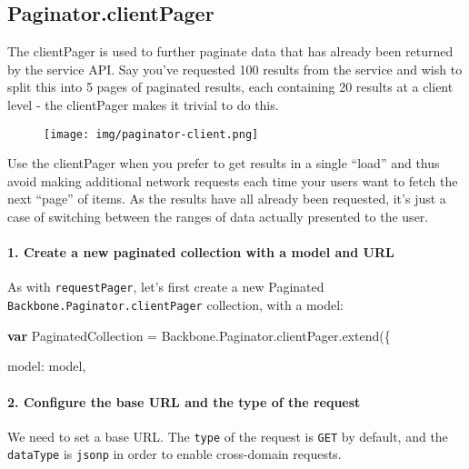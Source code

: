 \documentclass[9pt]{book}
\newenvironment{Shaded}{}{}
\newcommand{\KeywordTok}[1]{\textcolor[rgb]{0.00,0.44,0.13}{\textbf{{#1}}}}
\newcommand{\DataTypeTok}[1]{\textcolor[rgb]{0.56,0.13,0.00}{{#1}}}
\newcommand{\OtherTok}[1]{\textcolor[rgb]{0.00,0.44,0.13}{{#1}}}
\newcommand{\FunctionTok}[1]{\textcolor[rgb]{0.02,0.16,0.49}{{#1}}}
\newcommand{\NormalTok}[1]{{#1}}
\begin{document}
\subsection{Paginator.clientPager}\label{paginator.clientpager}

The clientPager is used to further paginate data that has already been
returned by the service API. Say you've requested 100 results from the
service and wish to split this into 5 pages of paginated results, each
containing 20 results at a client level - the clientPager makes it
trivial to do this.

\begin{figure}[htbp]
\centering
\texttt{[image: img/paginator-client.png]}
\end{figure}

Use the clientPager when you prefer to get results in a single ``load''
and thus avoid making additional network requests each time your users
want to fetch the next ``page'' of items. As the results have all
already been requested, it's just a case of switching between the ranges
of data actually presented to the user.

\paragraph{1. Create a new paginated collection with a model and
URL}\label{create-a-new-paginated-collection-with-a-model-and-url}

As with \texttt{requestPager}, let's first create a new Paginated
\texttt{Backbone.Paginator.clientPager} collection, with a model:

\begin{Shaded}
\begin{Highlighting}[]
    \KeywordTok{var} \NormalTok{PaginatedCollection = }\OtherTok{Backbone}\NormalTok{.}\OtherTok{Paginator}\NormalTok{.}\OtherTok{clientPager}\NormalTok{.}\FunctionTok{extend}\NormalTok{(\{}

        \DataTypeTok{model}\NormalTok{: model,}
\end{Highlighting}
\end{Shaded}

\paragraph{2. Configure the base URL and the type of the
request}\label{configure-the-base-url-and-the-type-of-the-request-1}

We need to set a base URL. The \texttt{type} of the request is
\texttt{GET} by default, and the \texttt{dataType} is \texttt{jsonp} in
order to enable cross-domain requests.
\end{document}
